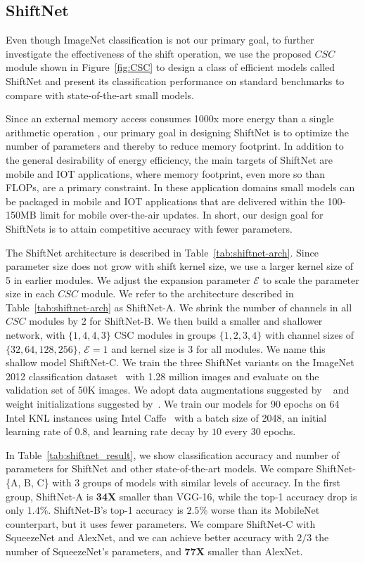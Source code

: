 \documentclass[10pt,twocolumn,letterpaper]{article}
\begin{document}
\subsection{ShiftNet}

Even though ImageNet classification is not our primary goal, to further investigate the effectiveness of the shift operation, we use the proposed $CSC$ module shown in Figure~\ref{fig:CSC} to design a class of efficient models called ShiftNet and present its classification performance on standard benchmarks to compare with state-of-the-art small models. 

Since an external memory access consumes 1000x more energy than a single arithmetic operation \cite{effcient_learning}, our primary goal in designing ShiftNet is to optimize the number of parameters and thereby to reduce memory footprint.
In addition to the general desirability of energy efficiency, 
the main targets of ShiftNet are mobile and IOT applications, 
where memory footprint, even
more so than FLOPs, are a primary constraint.
In these application domains small models can be packaged in mobile and IOT applications that are delivered within the 100-150MB limit for mobile over-the-air updates. In short, our design goal for ShiftNets is to attain competitive accuracy with fewer parameters.

The ShiftNet architecture is described in Table~\ref{tab:shiftnet-arch}. Since parameter size does not grow with shift kernel size, we use a larger kernel size of 5 in earlier modules. We adjust the expansion parameter $\mathcal{E}$ to scale the parameter size in each $CSC$ module. We refer to the architecture described in Table~\ref{tab:shiftnet-arch} as ShiftNet-A. We shrink the number of channels in all $CSC$ modules by 2 for ShiftNet-B. We then build a smaller and shallower network, with $\{1, 4, 4, 3\}$ CSC modules in groups $\{1, 2, 3, 4\}$ with channel sizes of $\{32, 64, 128, 256\}$, $\mathcal{E}=1$ and kernel size is 3 for all modules. We name this shallow model ShiftNet-C. 
We train the three ShiftNet variants on the ImageNet 2012 classification dataset~\cite{ILSVRC15} with 1.28 million images and evaluate on the validation set of 50K images. We adopt data augmentations suggested by ~\cite{Xception} and weight initializations suggested by~\cite{ResNet}. We train our models for 90 epochs on 64 Intel KNL instances using Intel Caffe~\cite{caffe} with a batch size of 2048, an initial learning rate of 0.8, and learning rate decay by $10$ every 30 epochs. 

In Table~\ref{tab:shiftnet_result}, we show classification accuracy and number of parameters for ShiftNet and other state-of-the-art models. We compare ShiftNet-\{A, B, C\} with 3 groups of models with similar levels of accuracy. In the first group, ShiftNet-A is \textbf{34X} smaller than VGG-16, while the top-1 accuracy drop is only $1.4\%$. ShiftNet-B's top-1 accuracy is $2.5\%$ worse than its MobileNet counterpart, but it uses fewer parameters. We compare ShiftNet-C with SqueezeNet and AlexNet, and we can achieve better accuracy with $2/3$ the number of SqueezeNet's parameters, and \textbf{77X} smaller than AlexNet.
\end{document}
